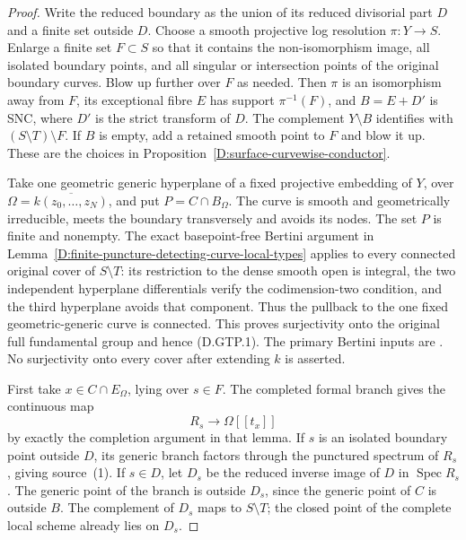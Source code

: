 \begin{proof}
Write the reduced boundary as the union of its reduced divisorial
part $D$ and a finite set outside $D$. Choose a smooth projective
log resolution $\pi:Y\to S$. Enlarge a finite set $F\subset S$
so that it contains the non-isomorphism image, all isolated
boundary points, and all singular or intersection points of the
original boundary curves. Blow up further over $F$ as needed.
Then $\pi$ is an isomorphism away from $F$, its exceptional
fibre $E$ has support $\pi^{-1}(F)$, and
$B=E+D'$ is SNC, where $D'$ is the strict transform of $D$.
The complement $Y\setminus B$ identifies with
$(S\setminus T)\setminus F$. If $B$ is empty, add a retained
smooth point to $F$ and blow it up. These are the choices in
Proposition~\ref{D:surface-curvewise-conductor}.

Take one geometric generic hyperplane of a fixed projective
embedding of $Y$, over
$\Omega=\overline{k(z_0,\ldots,z_N)}$, and put $P=C\cap B_\Omega$.
The curve is smooth and geometrically irreducible, meets the
boundary transversely and avoids its nodes. The set $P$ is finite
and nonempty. The exact basepoint-free Bertini argument in
Lemma~\ref{D:finite-puncture-detecting-curve-local-types} applies
to every connected original cover of $S\setminus T$: its
restriction to the dense smooth open is integral, the two
independent hyperplane differentials verify the codimension-two
condition, and the third hyperplane avoids that component.
Thus the pullback to the one fixed geometric-generic curve is
connected. This proves surjectivity onto the original full
fundamental group and hence (D.GTP.1). The primary Bertini
inputs are \citep[Lemmas~33.47.3 and~37.32.1--3, Tags~0FD6 and
0G4C]{StacksDGenericSurface}. No surjectivity onto every cover
after extending $k$ is asserted.

First take $x\in C\cap E_\Omega$, lying over $s\in F$.
The completed formal branch gives the continuous map
\[
                 R_s\longrightarrow\Omega[[t_x]]
                                                        \tag{D.GTP.2}
\]
by exactly the completion argument in that lemma. If $s$ is
an isolated boundary point outside $D$, its generic branch
factors through the punctured spectrum of $R_s$, giving source~(1).
If $s\in D$, let $D_s$ be the reduced inverse image of $D$ in
$\operatorname{Spec}R_s$. The generic point of the branch is
outside $D_s$, since the generic point of $C$ is outside $B$.
The complement of $D_s$ maps to $S\setminus T$; the closed point
of the complete local scheme already lies on $D_s$.


\end{proof}
